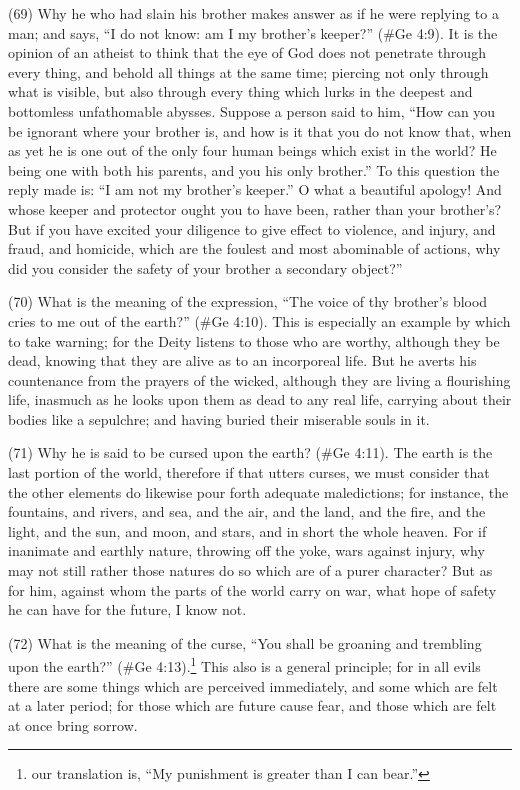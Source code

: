 (69) Why he who had slain his brother makes answer as if he were replying to a man; and says, ``I
do not know: am I my brother's keeper?'' (\#Ge 4:9). It is the opinion of an atheist to think that
the eye of God does not penetrate through every thing, and behold all things at the same time;
piercing not only through what is visible, but also through every thing which lurks in the deepest and
bottomless unfathomable abysses. Suppose a person said to him, ``How can you be ignorant
where your brother is, and how is it that you do not know that, when as yet he is one out of the only
four human beings which exist in the world? He being one with both his parents, and you his only
brother.'' To this question the reply made is: ``I am not my brother's keeper.'' O what a beautiful
apology! And whose keeper and protector ought you to have been, rather than your brother's? But
if you have excited your diligence to give effect to violence, and injury, and fraud, and homicide,
which are the foulest and most abominable of actions, why did you consider the safety of your
brother a secondary object?''

(70) What is the meaning of the expression, ``The voice of thy brother's blood cries to me out of
the earth?'' (\#Ge 4:10). This is especially an example by which to take warning; for the Deity
listens to those who are worthy, although they be dead, knowing that they are alive as to an
incorporeal life. But he averts his countenance from the prayers of the wicked, although they are
living a flourishing life, inasmuch as he looks upon them as dead to any real life, carrying about
their bodies like a sepulchre; and having buried their miserable souls in it.

(71) Why he is said to be cursed upon the earth? (\#Ge 4:11). The earth is the last portion of
the world, therefore if that utters curses, we must consider that the other elements do likewise pour
forth adequate maledictions; for instance, the fountains, and rivers, and sea, and the air, and the
land, and the fire, and the light, and the sun, and moon, and stars, and in short the whole heaven.
For if inanimate and earthly nature, throwing off the yoke, wars against injury, why may not still
rather those natures do so which are of a purer character? But as for him, against whom the parts
of the world carry on war, what hope of safety he can have for the future, I know not.

(72) What is the meaning of the curse, ``You shall be groaning and trembling upon the earth?''
(\#Ge 4:13).\footnote{our translation is, ``My punishment is greater than I can bear.''} This also is a general
principle; for in all evils there are some things which are perceived immediately, and some which
are felt at a later period; for those which are future cause fear, and those which are felt at once
bring sorrow.

